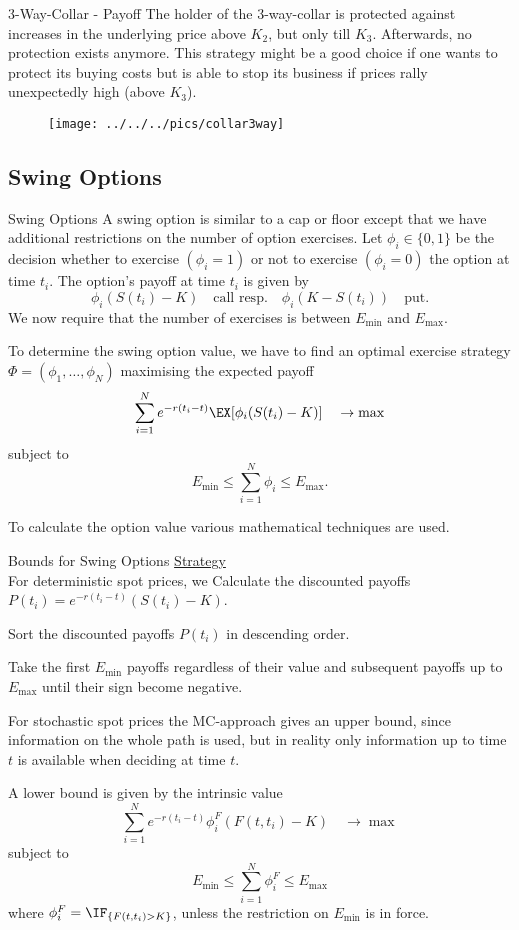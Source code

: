 3-Way-Collar - Payoff
The holder of the 3-way-collar is protected against increases in the underlying price above $K_2$, but only till $K_3$. Afterwards, no protection exists anymore. This strategy might be a good choice if one wants to protect its buying costs but is able to stop its business if prices rally unexpectedly high (above $K_3$).
\begin{figure}
	\centering
		\texttt{[image: ../../../pics/collar3way]}
	\label{fig:collar3way}
\end{figure}


\subsection{Swing Options}
Swing Options
A swing option is similar to a cap or floor except that we have
additional restrictions on the number of option exercises. Let
$\phi_i\in\{0,1\}$ be the decision whether to exercise
$(\phi_i=1)$ or not to exercise $(\phi_i=0)$ the option at time
$t_i$. The option's payoff at time $t_i$ is given by
$$\phi_i(S(t_i)-K)\quad\mbox{call resp.}\quad\phi_i(K-S(t_i))\quad\mbox{put}.$$
We now require that the number of exercises is between $E_{\min}$
and $E_{\max}$.

To determine the swing option value, we have to find an optimal exercise
strategy $\Phi=(\phi_1,\ldots,\phi_N)$ maximising the expected
payoff
$$\sum_{i=1}^Ne^{-r(t_i-t)}\EX[{\phi_i(S(t_i)-K)}]\quad\rightarrow\max$$
subject to $$E_{\min}\leq\sum_{i=1}^N\phi_i\leq E_{\max}.$$

To calculate the option value various mathematical techniques are used.


Bounds for Swing Options
	\underline{Strategy}\\
	For deterministic spot prices, we
		Calculate the discounted payoffs $P(t_i)=e^{-r(t_i-t)}(S(t_i)-K)$.
    
		Sort the discounted payoffs $P(t_i)$ in descending order.
		
		Take the first $E_{\min}$ payoffs regardless of their
		value and subsequent payoffs up to $E_{\max}$ until their sign
		become negative.

	For stochastic spot prices the MC-approach gives an upper bound,
	since information on the whole path is used, but in reality only
	information up to time $t$ is available when deciding at time $t$.

	A lower bound is given by the intrinsic value
	$$\sum_{i=1}^Ne^{-r(t_i-t)} \phi_i^F (F(t,t_i)-K) \quad\rightarrow\max$$
	subject to $$E_{\min}\leq\sum_{i=1}^N\phi^F_i\leq E_{\max}$$
	where $\phi_i^F=\IF_{\{F(t,t_i)>K\}}$, unless the restriction on $E_{\min}$ is in force.


